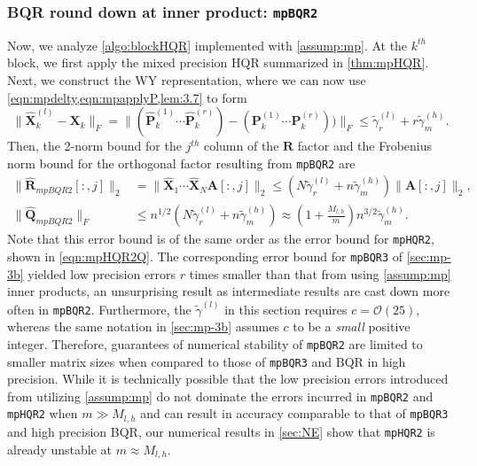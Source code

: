 \documentclass[review,onefignum,onetabnum]{siamart190516}
\newcommand{\bb}[1]{\mathbf{#1}}
\newcommand{\cO}{\mathcal{O}}
\begin{document}
\subsubsection{BQR round down at inner product: {\tt mpBQR2}}
Now, we analyze \cref{algo:blockHQR} implemented with \cref{assump:mp}. 
At the $k^{th}$ block, we first apply the mixed precision HQR summarized in \cref{thm:mpHQR}.
Next, we construct the WY representation, where we can now use \cref{eqn:mpdelty,eqn:mpapplyP,lem:3.7} to form
\begin{equation}
	\|\hat{\bb{X}}_{k}^{(l)}- \bb{X}_k\|_F = \|(\hat{\bb{P}}_k^{(1)}\cdots \hat{\bb{P}}_k^{(r)})-(\bb{P}_k^{(1)}\cdots \bb{P}_k^{(r)}))\|_F \leq \tilde{\gamma}_{r}^{(l)} + r\tilde{\gamma}_{m}^{(h)}.
\end{equation}
Then, the 2-norm bound for the $j^{th}$ column of the $\bb{R}$ factor and the Frobenius norm bound for the orthogonal factor resulting from {\tt mpBQR2} are
\begin{align}
	\|\hat{\bb{R}}_{mpBQR2}[:,j]\|_2 &= \|\hat{\bb{X}}_1\cdots\hat{\bb{X}}_N\bb{A}[:,j]\|_2\leq\left( N\tilde{\gamma}_{r}^{(l)} + n\tilde{\gamma}_{m}^{(h)}\right)\|\bb{A}[:,j]\|_2,\\
	\|\hat{\bb{Q}}_{mpBQR2}\|_F &\leq n^{1/2}\left(N\tilde{\gamma}_{r}^{(l)} + n\tilde{\gamma}_{m}^{(h)}\right) \approx \left(1+\frac{M_{l,h}}{m}\right)n^{3/2}\tilde{\gamma}_{m}^{(h)}. \label{eqn:mpBQR2}
\end{align}
Note that this error bound is of the same order as the error bound for {\tt mpHQR2}, shown in \cref{eqn:mpHQR2Q}.
The corresponding error bound for {\tt mpBQR3} of \cref{sec:mp-3b} yielded low precision errors $r$ times smaller than that from 
using \cref{assump:mp} inner products, an unsurprising result as intermediate results are cast down more often in {\tt mpBQR2}.
Furthermore, the $\tilde{\gamma}^{(l)}$ in this section requires $c=\cO(25)$, whereas the same notation in \cref{sec:mp-3b} assumes $c$ to be a \emph{small} positive integer.
Therefore, guarantees of numerical stability of {\tt mpBQR2} are limited to smaller matrix sizes when compared to those of {\tt mpBQR3} and BQR in high precision.
While it is technically possible that the low precision errors introduced from utilizing \cref{assump:mp} do not dominate the errors incurred in {\tt mpBQR2} and {\tt mpHQR2} when $m\gg M_{l,h}$ and can result in accuracy comparable to that of {\tt mpBQR3} and high precision BQR, our numerical results in \cref{sec:NE} show that {\tt mpHQR2} is already unstable at $m\approx M_{l,h}$.
\end{document}
